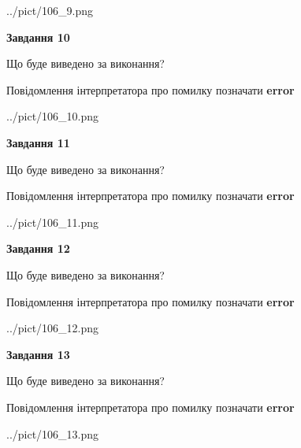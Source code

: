 \documentclass[11pt, ukrainian]{article}
\begin{document}
{\begin {large}
\begin{center}
	{../pict/106_9.png}
\end{center}
\newpage

{\begin {center}\textbf{Завдання 10}\end {center}}\par
Що буде виведено за виконання? \par
Повідомлення інтерпретатора про помилку позначати \textbf{error}

\begin{center}
	{../pict/106_10.png}
\end{center}
\newpage

{\begin {center}\textbf{Завдання 11}\end {center}}\par
Що буде виведено за виконання? \par
Повідомлення інтерпретатора про помилку позначати \textbf{error}

\begin{center}
	{../pict/106_11.png}
\end{center}
\newpage

{\begin {center}\textbf{Завдання 12}\end {center}}\par
Що буде виведено за виконання? \par
Повідомлення інтерпретатора про помилку позначати \textbf{error}

\begin{center}
	{../pict/106_12.png}
\end{center}
\newpage

{\begin {center}\textbf{Завдання 13}\end {center}}\par
Що буде виведено за виконання? \par
Повідомлення інтерпретатора про помилку позначати \textbf{error}

\begin{center}
	{../pict/106_13.png}
\end{center}
\newpage


\end{large}}
\end{document}
